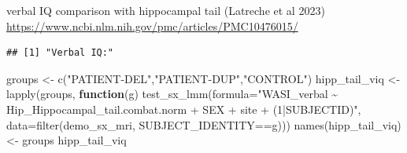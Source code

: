 \documentclass[
]{article}
\newenvironment{Shaded}{\begin{snugshade}}{\end{snugshade}}
\newcommand{\AttributeTok}[1]{\textcolor[rgb]{0.77,0.63,0.00}{#1}}
\newcommand{\CommentTok}[1]{\textcolor[rgb]{0.56,0.35,0.01}{\textit{#1}}}
\newcommand{\ConstantTok}[1]{\textcolor[rgb]{0.00,0.00,0.00}{#1}}
\newcommand{\ControlFlowTok}[1]{\textcolor[rgb]{0.13,0.29,0.53}{\textbf{#1}}}
\newcommand{\FunctionTok}[1]{\textcolor[rgb]{0.00,0.00,0.00}{#1}}
\newcommand{\NormalTok}[1]{#1}
\newcommand{\OtherTok}[1]{\textcolor[rgb]{0.56,0.35,0.01}{#1}}
\newcommand{\SpecialCharTok}[1]{\textcolor[rgb]{0.00,0.00,0.00}{#1}}
\newcommand{\StringTok}[1]{\textcolor[rgb]{0.31,0.60,0.02}{#1}}
\begin{document}
verbal IQ comparison with hippocampal tail (Latreche et al 2023)
\url{https://www.ncbi.nlm.nih.gov/pmc/articles/PMC10476015/}

\begin{Shaded}
\end{Shaded}

\begin{verbatim}
## [1] "Verbal IQ:"
\end{verbatim}

\begin{Shaded}
\begin{Highlighting}[]
\NormalTok{groups }\OtherTok{\textless{}{-}} \FunctionTok{c}\NormalTok{(}\StringTok{"PATIENT{-}DEL"}\NormalTok{,}\StringTok{"PATIENT{-}DUP"}\NormalTok{,}\StringTok{"CONTROL"}\NormalTok{)}
\NormalTok{hipp\_tail\_viq }\OtherTok{\textless{}{-}} \FunctionTok{lapply}\NormalTok{(groups, }\ControlFlowTok{function}\NormalTok{(g) }\FunctionTok{test\_sx\_lmm}\NormalTok{(}\AttributeTok{formula=}\StringTok{"WASI\_verbal \textasciitilde{} Hip\_Hippocampal\_tail.combat.norm + SEX + site  + (1|SUBJECTID)"}\NormalTok{, }\AttributeTok{data=}\FunctionTok{filter}\NormalTok{(demo\_sx\_mri, SUBJECT\_IDENTITY}\SpecialCharTok{==}\NormalTok{g)))}
\FunctionTok{names}\NormalTok{(hipp\_tail\_viq) }\OtherTok{\textless{}{-}}\NormalTok{ groups}
\NormalTok{hipp\_tail\_viq}
\end{Highlighting}
\end{Shaded}
\end{document}
